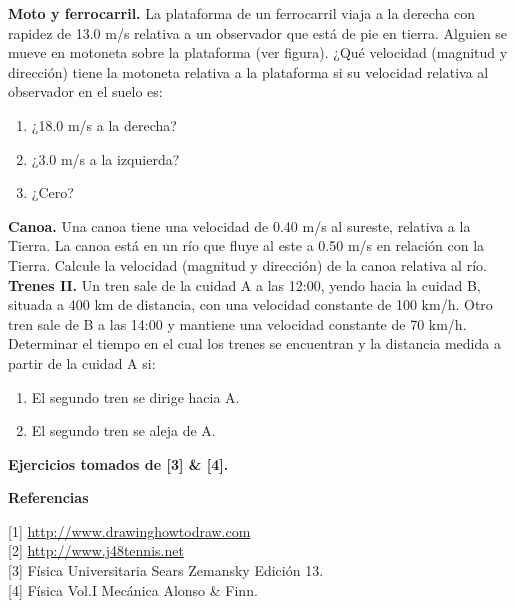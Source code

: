 \documentclass[a4paper,11pt]{article}
\begin{document}
	\color{pr}\textbf{Moto y ferrocarril. }\color{black}	La plataforma de un ferrocarril viaja a la derecha con rapidez
	de 13.0 m/s relativa a un observador que está de pie en tierra. Alguien
	se mueve en motoneta sobre la plataforma (ver figura). ¿Qué velocidad (magnitud y dirección) tiene la motoneta relativa a la plataforma
	si su velocidad relativa al observador en el suelo es:
	\begin{enumerate}
		\item ¿18.0 m/s a la
		derecha?
		\item ¿3.0 m/s a la izquierda?
		\item ¿Cero?
	\end{enumerate}
	
\color{pr}	\textbf{Canoa. }\color{black} Una canoa tiene una velocidad de 0.40 m/s al sureste, relativa
	a la Tierra. La canoa está en un río que fluye al este a 0.50 m/s en
	relación con la Tierra. Calcule la velocidad (magnitud y dirección) de
	la canoa relativa al río.\\
	
	
\color{pr}	\textbf{Trenes II. }\color{black} Un tren sale de la cuidad A a las 12:00, yendo hacia la cuidad B, situada a 400 km de distancia, con una velocidad constante de 100 km/h. Otro tren sale de B a las 14:00 y mantiene una velocidad constante de 70 km/h. Determinar el tiempo en el cual los trenes se encuentran y la distancia medida a partir de la cuidad A si:
	
	\begin{enumerate}
		\item El segundo tren se dirige hacia A.
		\item  El segundo tren se aleja de A. 
	\end{enumerate}

	
\small	\textbf{Ejercicios tomados de [3] \& [4].} \normalsize
	\vspace{1cm}
		
\Large	\textbf{Referencias} \normalsize
	
	[1] \url{http://www.drawinghowtodraw.com}\\
	
	[2] \url{http://www.j48tennis.net}\\
	
	[3] Física Universitaria Sears Zemansky Edición 13.\\
	
	[4] Física Vol.I Mecánica Alonso \& Finn.
	
	
\end{document}
